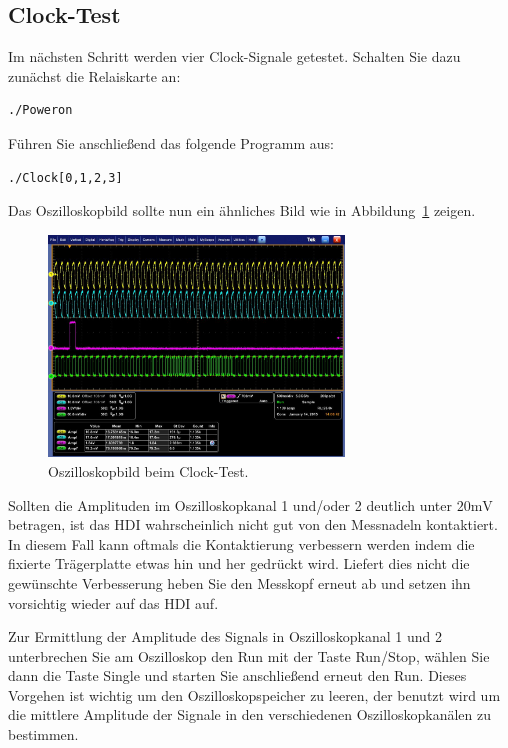 \documentclass[a4paper,12pt,pointlessnumbers]{scrartcl}
\begin{document}
\subsection{Clock-Test}\label{sec:clocktest}
Im n{\"a}chsten Schritt werden vier Clock-Signale getestet.
Schalten Sie dazu zun{\"a}chst die Relaiskarte an:
\begin{lstlisting}[style=console2]
 ./Poweron
\end{lstlisting}
F{\"u}hren Sie anschlie{\ss}end das folgende Programm aus:
\begin{lstlisting}[style=console2]
 ./Clock[0,1,2,3]
\end{lstlisting}
Das Oszilloskopbild sollte nun ein {\"a}hnliches Bild wie in Abbildung~\ref{fig:clocktest} zeigen.
\begin{figure}
\centering
  \includegraphics[width=0.7\textwidth]{figures/2_clock.jpg}
 \caption{Oszilloskopbild beim Clock-Test.}
 \label{fig:clocktest}
\end{figure}

Sollten die Amplituden im Oszilloskopkanal 1 und/oder 2 deutlich unter $20\mathrm{mV}$ betragen, ist das HDI wahrscheinlich nicht gut von den Messnadeln kontaktiert.
In diesem Fall kann oftmals die Kontaktierung verbessern werden indem die fixierte Tr{\"a}gerplatte etwas hin und her gedr{\"u}ckt wird.
Liefert dies nicht die gew{\"u}nschte Verbesserung heben Sie den Messkopf erneut ab und setzen ihn vorsichtig wieder auf das HDI auf.

Zur Ermittlung der Amplitude des Signals in Oszilloskopkanal 1 und 2 unterbrechen Sie am Oszilloskop den Run mit der Taste Run/Stop, w{\"a}hlen Sie dann die Taste Single und starten Sie anschlie{\ss}end erneut den Run.
Dieses Vorgehen ist wichtig um den Oszilloskopspeicher zu leeren, der benutzt wird um die mittlere Amplitude der Signale in den verschiedenen Oszilloskopkan{\"a}len zu bestimmen.
\end{document}
